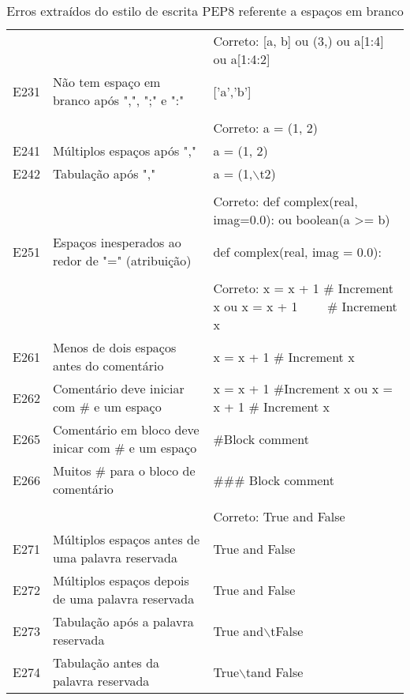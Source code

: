 \begin{table}
\begin{tabularx}{\linewidth}{ |l|X|X| }
			& 
			&  \\ 
			\hline
			
			& 
			& Correto: [a, b] ou (3,) ou a[1:4] ou a[1:4:2] \\ 
			\hline
			E231 
			& Não tem espaço em branco após ",", ";" e ":" 
			& ['a','b'] \\ 
			\hline
			
			& 
			&  \\ 
			\hline
			
			& 
			& Correto: a = (1, 2) \\ 
			\hline
			E241 
			& Múltiplos espaços após "," 
			& a = (1,  2) \\ 
			\hline
			E242 
			& Tabulação após "," 
			& a = (1,$\backslash$t2) \\ 
			\hline
			
			& 
			&  \\ 
			\hline
			
			& 
			& Correto: def complex(real, imag=0.0): ou boolean(a >= b) \\ 
			\hline
			E251 
			& Espaços inesperados ao redor de "=" (atribuição) 
			& def complex(real, imag = 0.0): \\ 
			\hline
			
			& 
			&  \\ 
			\hline
			
			& 
			& Correto: x = x + 1  \# Increment x ou x = x + 1 \ \ \ \ \# Increment x \\ 
			\hline
			E261 
			& Menos de dois espaços antes do comentário 
			& x = x + 1 \# Increment x \\ 
			\hline
			E262 
			& Comentário deve iniciar com \# e um espaço 
			& x = x + 1  \#Increment x ou x = x + 1  \#  Increment x \\ 
			\hline
			E265 
			& Comentário em bloco deve inicar com \# e um espaço 
			& \#Block comment \\ 
			\hline
			E266 
			& Muitos \# para o bloco de comentário 
			& \#\#\# Block comment \\ 
			\hline
			
			& 
			&  \\ 
			\hline
			
			& 
			& Correto: True and False \\ 
			\hline
			E271 
			& Múltiplos espaços antes de uma palavra reservada
			& True and  False \\ 
			\hline
			E272 
			& Múltiplos espaços depois de uma palavra reservada 
			& True  and False \\ 
			\hline
			E273 
			& Tabulação após a palavra reservada 
			& True and$\backslash$tFalse \\ 
			\hline
			E274 
			& Tabulação antes da palavra reservada 
			& True$\backslash$tand False \\ 
			\hline
		\end{tabularx}
		\caption{Erros extraídos do estilo de escrita PEP8 referente a espaços em branco}
		\label{tab:pep8E200}
	\end{table}

